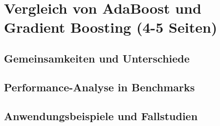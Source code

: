 \section{Vergleich von AdaBoost und Gradient Boosting (4-5 Seiten)}
\subsection{Gemeinsamkeiten und Unterschiede}
\subsection{Performance-Analyse in Benchmarks}
\subsection{Anwendungsbeispiele und Fallstudien}